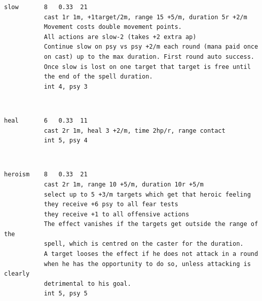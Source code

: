 \begin{samepage}
\begin{verbatim}
slow       8   0.33  21
           cast 1r 1m, +1target/2m, range 15 +5/m, duration 5r +2/m
           Movement costs double movement points.
           All actions are slow-2 (takes +2 extra ap)
           Continue slow on psy vs psy +2/m each round (mana paid once
           on cast) up to the max duration. First round auto success.
           Once slow is lost on one target that target is free until
           the end of the spell duration.
           int 4, psy 3
\end{verbatim} \end{samepage}   \   \goodbreak \begin{samepage} \begin{verbatim}
heal       6   0.33  11
           cast 2r 1m, heal 3 +2/m, time 2hp/r, range contact
           int 5, psy 4
\end{verbatim} \end{samepage}   \   \goodbreak \begin{samepage} \begin{verbatim}
heroism    8   0.33  21
           cast 2r 1m, range 10 +5/m, duration 10r +5/m
           select up to 5 +3/m targets which get that heroic feeling
           they receive +6 psy to all fear tests
           they receive +1 to all offensive actions
           The effect vanishes if the targets get outside the range of the
           spell, which is centred on the caster for the duration.
           A target looses the effect if he does not attack in a round
           when he has the opportunity to do so, unless attacking is clearly
           detrimental to his goal.
           int 5, psy 5
\end{verbatim} \end{samepage} \normalsize

\

